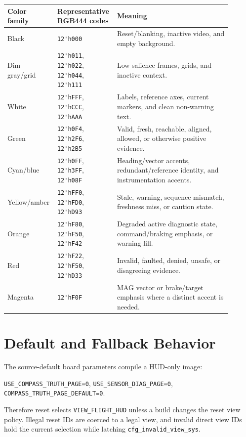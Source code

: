 \documentclass{article}
\newcommand{\sig}[1]{\begingroup\nolinkurl{#1}\endgroup}
\newcommand{\param}[1]{\begingroup\nolinkurl{#1}\endgroup}
\begin{document}
\begin{longtable}{p{0.18\linewidth} p{0.22\linewidth} p{0.50\linewidth}}
\toprule
\textbf{Color family} & \textbf{Representative RGB444 codes} & \textbf{Meaning} \\
\midrule
\endhead
Black & \sig{12'h000} & Reset/blanking, inactive video, and empty background. \\
Dim gray/grid & \sig{12'h011}, \sig{12'h022}, \sig{12'h044}, \sig{12'h111} & Low-salience frames, grids, and inactive context. \\
White & \sig{12'hFFF}, \sig{12'hCCC}, \sig{12'hAAA} & Labels, reference axes, current markers, and clean non-warning text. \\
Green & \sig{12'h0F4}, \sig{12'h2F6}, \sig{12'h2B5} & Valid, fresh, reachable, aligned, allowed, or otherwise positive evidence. \\
Cyan/blue & \sig{12'h0FF}, \sig{12'h3FF}, \sig{12'h08F} & Heading/vector accents, redundant/reference identity, and instrumentation accents. \\
Yellow/amber & \sig{12'hFF0}, \sig{12'hFD0}, \sig{12'hD93} & Stale, warning, sequence mismatch, freshness miss, or caution state. \\
Orange & \sig{12'hF80}, \sig{12'hF50}, \sig{12'hF42} & Degraded active diagnostic state, command/braking emphasis, or warning fill. \\
Red & \sig{12'hF22}, \sig{12'hF50}, \sig{12'hD33} & Invalid, faulted, denied, unsafe, or disagreeing evidence. \\
Magenta & \sig{12'hF0F} & MAG vector or brake/target emphasis where a distinct accent is needed. \\
\bottomrule
\end{longtable}

\section{Default and Fallback Behavior}

The source-default board parameters compile a HUD-only image:
\begin{center}
\param{USE_COMPASS_TRUTH_PAGE=0}, \quad
\param{USE_SENSOR_DIAG_PAGE=0}, \quad
\param{COMPASS_TRUTH_PAGE_DEFAULT=0}.
\end{center}
Therefore reset selects \sig{VIEW_FLIGHT_HUD} unless a build changes the reset
view policy.  Illegal reset IDs are coerced to a legal view, and invalid direct
view IDs hold the current selection while latching \sig{cfg_invalid_view_sys}.
\end{document}

